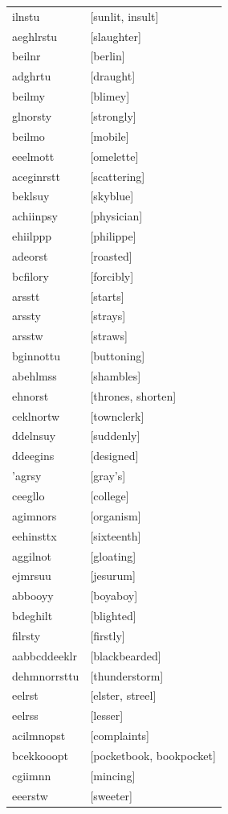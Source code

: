 \documentclass{article}
\begin{document}
\begin{tabular}{ll}
ilnstu & [sunlit, insult] \\
aeghlrstu & [slaughter] \\
beilnr & [berlin] \\
adghrtu & [draught] \\
beilmy & [blimey] \\
glnorsty & [strongly] \\
beilmo & [mobile] \\
eeelmott & [omelette] \\
aceginrstt & [scattering] \\
beklsuy & [skyblue] \\
achiinpsy & [physician] \\
ehiilppp & [philippe] \\
adeorst & [roasted] \\
bcfilory & [forcibly] \\
arsstt & [starts] \\
arssty & [strays] \\
arsstw & [straws] \\
bginnottu & [buttoning] \\
abehlmss & [shambles] \\
ehnorst & [thrones, shorten] \\
ceklnortw & [townclerk] \\
ddelnsuy & [suddenly] \\
ddeegins & [designed] \\
'agrsy & [gray's] \\
ceegllo & [college] \\
agimnors & [organism] \\
eehinsttx & [sixteenth] \\
aggilnot & [gloating] \\
ejmrsuu & [jesurum] \\
abbooyy & [boyaboy] \\
bdeghilt & [blighted] \\
filrsty & [firstly] \\
aabbcddeeklr & [blackbearded] \\
dehmnorrsttu & [thunderstorm] \\
eelrst & [elster, streel] \\
eelrss & [lesser] \\
acilmnopst & [complaints] \\
bcekkooopt & [pocketbook, bookpocket] \\
cgiimnn & [mincing] \\
eeerstw & [sweeter] \\

\end{tabular}
\end{document}
